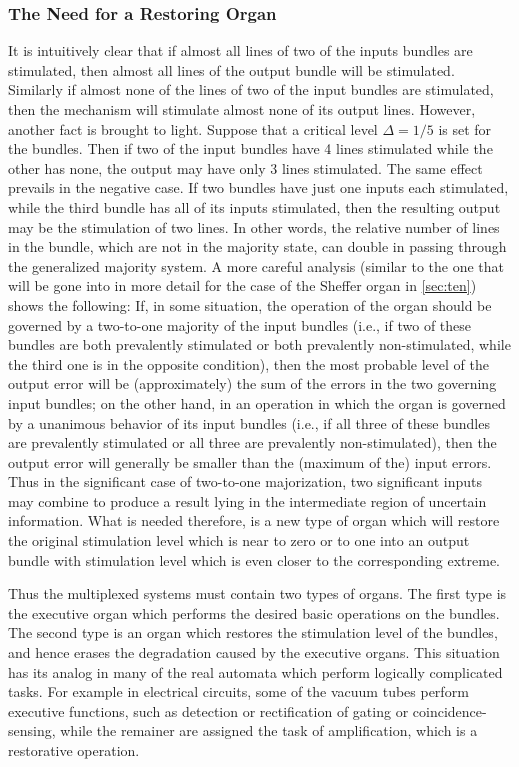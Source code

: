 \documentclass[twocolumn,preprintnumbers,amsmath,amssymb,floatfix]{revtex4}
\begin{document}
\subsubsection{\label{sec:nine2_2}The Need for a Restoring Organ}
It is intuitively clear that if almost all lines of two of the
inputs bundles are stimulated, then almost all lines of the output
bundle will be stimulated. Similarly if almost none of the lines
of two of the input bundles are stimulated, then the mechanism
will stimulate almost none of its output lines. However, another
fact is brought to light. Suppose that a critical level
$\Delta=1/5$ is set for the bundles. Then if two of the input
bundles have 4 lines stimulated while the other has none, the
output may have only 3 lines stimulated. The same effect prevails
in the negative case. If two bundles have just one inputs each
stimulated, while the third bundle has all of its inputs
stimulated, then the resulting output may be the stimulation of
two lines. In other words, the relative number of lines in the
bundle, which are not in the majority state, can double in passing
through the generalized majority system. A more careful analysis
(similar to the one that will be gone into in more detail for the
case of the Sheffer organ in \ref{sec:ten}) shows the following:
If, in some situation, the operation of the organ should be
governed by a two-to-one majority of the input bundles (i.e., if
two of these bundles are both prevalently stimulated or both
prevalently non-stimulated, while the third one is in the opposite
condition), then the most probable level of the output error will
be (approximately) the sum of the errors in the two governing
input bundles; on the other hand, in an operation in which the
organ is governed by a unanimous behavior of its input bundles
(i.e., if all three of these bundles are prevalently stimulated or
all three are prevalently non-stimulated), then the output error
will generally be smaller than the (maximum of the) input errors.
Thus in the significant case of two-to-one majorization, two
significant inputs may combine to produce a result lying in the
intermediate region of uncertain information. What is needed
therefore, is a new type of organ which will restore the original
stimulation level which is near to zero or to one into an output
bundle with stimulation level which is even closer to the
corresponding extreme.

Thus the multiplexed systems must contain two types of organs. The
first type is the executive organ which performs the desired basic
operations on the bundles. The second type is an organ which
restores the stimulation level of the bundles, and hence erases
the degradation caused by the executive organs. This situation has
its analog in many of the real automata which perform logically
complicated tasks. For example in electrical circuits, some of the
vacuum tubes perform executive functions, such as detection or
rectification of gating or coincidence-sensing, while the remainer
are assigned the task of amplification, which is a restorative
operation.
\end{document}
